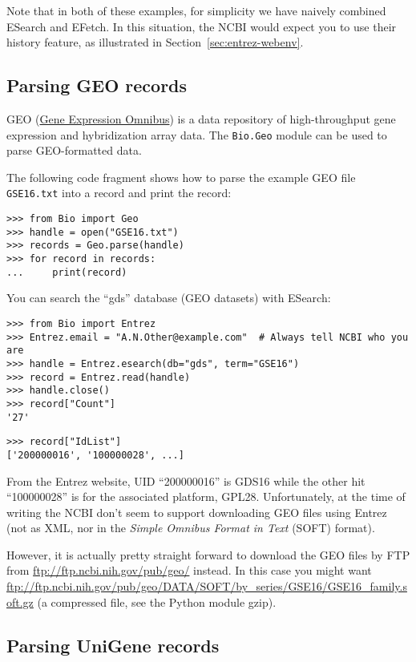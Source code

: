 Note that in both of these examples, for simplicity we have naively combined ESearch and EFetch.
In this situation, the NCBI would expect you to use their history feature,
as illustrated in Section~\ref{sec:entrez-webenv}.


\subsection{Parsing GEO records}

GEO (\href{https://www.ncbi.nlm.nih.gov/geo/}{Gene Expression Omnibus})
is a data repository of high-throughput gene expression and hybridization
array data. The \verb|Bio.Geo| module can be used to parse GEO-formatted
data.

The following code fragment shows how to parse the example GEO file
\verb|GSE16.txt| into a record and print the record:

\begin{verbatim}
>>> from Bio import Geo
>>> handle = open("GSE16.txt")
>>> records = Geo.parse(handle)
>>> for record in records:
...     print(record)
\end{verbatim}

You can search the ``gds'' database (GEO datasets) with ESearch:

\begin{verbatim}
>>> from Bio import Entrez
>>> Entrez.email = "A.N.Other@example.com"  # Always tell NCBI who you are
>>> handle = Entrez.esearch(db="gds", term="GSE16")
>>> record = Entrez.read(handle)
>>> handle.close()
>>> record["Count"]
'27'
\end{verbatim}
\begin{verbatim}
>>> record["IdList"]
['200000016', '100000028', ...]
\end{verbatim}

From the Entrez website, UID ``200000016'' is GDS16 while the other hit
``100000028'' is for the associated platform, GPL28.  Unfortunately, at the
time of writing the NCBI don't seem to support downloading GEO files using
Entrez (not as XML, nor in the \textit{Simple Omnibus Format in Text} (SOFT)
format).

However, it is actually pretty straight forward to download the GEO files by FTP
from \url{ftp://ftp.ncbi.nih.gov/pub/geo/} instead.  In this case you might want
\url{ftp://ftp.ncbi.nih.gov/pub/geo/DATA/SOFT/by_series/GSE16/GSE16_family.soft.gz}
(a compressed file, see the Python module gzip).

\subsection{Parsing UniGene records}

